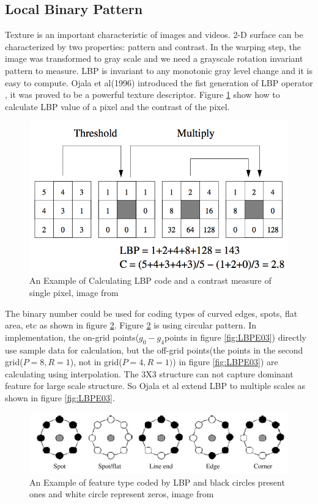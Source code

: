 \subsection{Local Binary Pattern}
Texture is an important characteristic of images and videos. 2-D surface can be characterized by two properties: pattern and contrast. In the warping step, the image was transformed to gray scale and we need a grayscale rotation invariant pattern to measure. LBP is invariant to any monotonic gray level change and it is easy to compute. Ojala et al(1996) introduced the fist generation of LBP operator \cite{shan2009facial}, it was proved to be a powerful texture descriptor. Figure \ref{fig:LBPE01} show how to calculate LBP value of a pixel and the contrast of the pixel.
\begin{figure}[ht]
\centering
\captionsetup{justification=centering,margin=3cm}
\includegraphics[width = .6\textwidth]{imgs/LBP_Example_1.png}
\caption{An Example of Calculating LBP code and \newline a contrast measure of single pixel, image from \cite{maenpaa2005texture}}
\label{fig:LBPE01}
\end{figure}
\newline
The binary number could be used for coding types of curved edges, spots, flat area, etc as shown in figure \ref{fig:LBPE02}. Figure \ref{fig:LBPE02} is using circular pattern. In implementation, the on-grid points($g_{0}-g_{4}$points in figure \ref{fig:LBPE03}) directly use sample data for calculation, but the off-grid points(the points in the second grid($P=8,R=1$), not in grid($P=4,R=1)$) in figure \ref{fig:LBPE03}) are calculating using interpolation. The 3X3 structure can not capture dominant feature for large scale structure\cite{shan2009facial}. So Ojala et al extend LBP to multiple scales as shown in figure \ref{fig:LBPE03}.
\begin{figure}[ht]
\centering
\captionsetup{justification=centering,margin=3cm}
\includegraphics[width = .6\textwidth]{imgs/LBP_Example_2.png}
\caption{An Example of feature type coded by LBP and \newline black circles present ones and white circle represent zeros, image from \cite{shan2009facial}}
\label{fig:LBPE02}
\end{figure}
